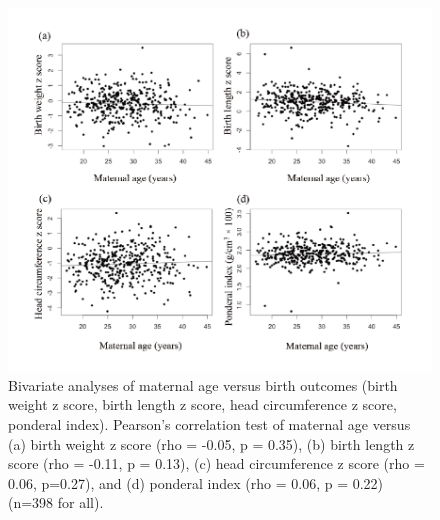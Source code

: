 \begin{figure}
  \centering
    \label{fig:Fig328}
  \includegraphics[scale=1]{Figures/Fig328.pdf}
  \caption[Bivariate analyses of maternal age versus birth outcomes (birth weight z score, birth length z score, head circumference z score, ponderal index)]{Bivariate analyses of maternal age versus birth outcomes (birth weight z score, birth length z score, head circumference z score, ponderal index). Pearson's correlation test of maternal age versus (a) birth weight z score (rho = -0.05, p = 0.35), (b) birth length z score (rho = -0.11, p = 0.13), (c) head circumference z score (rho = 0.06, p=0.27), and (d) ponderal index (rho = 0.06, p = 0.22) (n=398 for all).}
\end{figure}


